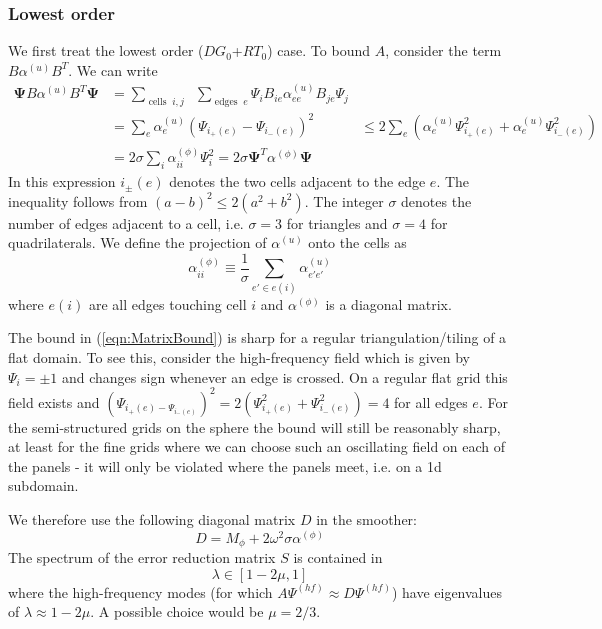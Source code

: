 \documentclass[12pt]{article}
\renewcommand{\vec}[1]{\boldsymbol{#1}}
\begin{document}
\subsubsection{Lowest order}
We first treat the lowest order ($DG_0$+$RT_0$) case.
To bound $A$, consider the term $B\alpha^{(u)} B^T$. We can write
\begin{equation}
 \begin{aligned}
  \vec{\Psi} B \alpha^{(u)} B^T \vec{\Psi} &= \sum_{\operatorname{cells}\;i,j}\;\;\sum_{\operatorname{edges}\;e} \Psi_i B_{ie} \alpha^{(u)}_{ee} B_{je} \Psi_j 
\\
  &= \sum_{e} \alpha_e^{(u)} \left(\Psi_{i_+(e)}-\Psi_{i_-(e)}\right)^2
  & \le 2\sum_e\left(\alpha_e^{(u)} \Psi_{i_+(e)}^2+\alpha_e^{(u)} \Psi_{i_-(e)}^2\right)\\
  &= 2 \sigma \sum_i \alpha_{ii}^{(\phi)} \Psi_i ^2 = 2\sigma \vec{\Psi}^T \alpha^{(\phi)}\vec{\Psi}
 \end{aligned}\label{eqn:MatrixBound}
\end{equation}
In this expression $i_{\pm}(e)$ denotes the two cells adjacent to the edge $e$. The inequality follows from $(a-b)^2 \le 2(a^2+b^2)$. The integer $\sigma$ denotes the number of edges adjacent to a cell, i.e. $\sigma=3$ for triangles and $\sigma=4$ for quadrilaterals. We define the projection of $\alpha^{(u)}$ onto the  cells as 
\begin{equation}
  \alpha^{(\phi)}_{ii} \equiv \frac{1}{\sigma} \sum_{e'\in e(i)} \alpha_{e'e'}^{(u)}
\end{equation}
where $e(i)$ are all edges touching cell $i$ and $\alpha^{(\phi)}$ is a diagonal matrix.

The bound in (\ref{eqn:MatrixBound}) is sharp for a regular triangulation/tiling of a flat domain. To see this, consider the high-frequency field which is given by $\Psi_i = \pm 1$ and changes sign whenever an edge is crossed. On a regular flat grid this field exists and $(\Psi_{i_+(e)-\Psi_{i_-(e)}})^2 = 2 (\Psi_{i_+(e)}^2+\Psi_{i_-(e)}^2) = 4$ for all edges $e$. For the semi-structured grids on the sphere the bound will still be reasonably sharp, at least for the fine grids where we can choose such an oscillating field on each of the panels - it will only be violated where the panels meet, i.e. on a 1d subdomain.

We therefore use the following diagonal matrix $D$ in the smoother:
\begin{equation}
  D = M_{\phi} + 2\omega^2 \sigma \alpha^{(\phi)}
\label{eqn:blockSmootherLO}
\end{equation}
The spectrum of the error reduction matrix $S$ is contained in
\begin{equation}
  \lambda \in [1-2\mu,1]
\end{equation}
where the high-frequency modes (for which $A\Psi^{(hf)}\approx D\Psi^{(hf)}$) have eigenvalues of $\lambda \approx 1-2\mu$. A possible choice would be $\mu=2/3$.
\end{document}
